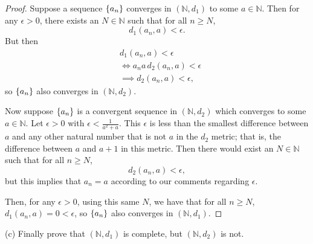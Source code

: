 \documentclass{article}
\newcommand{\N}{\mathbb{N}}
\begin{document}
\begin{proof}

Suppose a sequence $\cbr{a_n}$ converges in $(\N, d_1)$ to some $a \in
\N$. Then for any $\epsilon > 0$, there exists an $N \in \N$ such that
for all $n \geq N$,
%
\begin{equation*}
    d_1(a_n, a) < \epsilon
    .
\end{equation*}
%
But then
%
\begin{align*}
    &d_1(a_n, a) < \epsilon \\
    &\iff a_n a \, d_2(a_n, a) < \epsilon \\
    &\implies d_2(a_n, a) < \epsilon
    ,
\end{align*}
%
so $\cbr{a_n}$ also converges in $(\N, d_2)$.

Now suppose $\cbr{a_n}$ is a convergent sequence in $(\N, d_2)$ which
converges to some $a \in \N$. Let $\epsilon > 0$ with $\epsilon <
\frac{1}{a^2 + a}$. This $\epsilon$ is less than the smallest difference
between $a$ and any other natural number that is not $a$ in the $d_2$
metric; that is, the difference between $a$ and $a + 1$ in this metric.
Then there would exist an $N \in \N$ such that for all $n \geq N$,
%
\begin{equation*}
    d_2(a_n, a) < \epsilon
    ,
\end{equation*}
%
but this implies that $a_n = a$ according to our comments regarding
$\epsilon$.

Then, for any $\epsilon > 0$, using this same $N$, we have that for all
$n \geq N$, $d_1(a_n, a) = 0 < \epsilon$, so $\cbr{a_n}$ also converges
in $(\N, d_1)$.

\end{proof}

\newpage

(c) Finally prove that $(\N, d_1)$ is complete, but $(\N, d_2)$ is not.
\end{document}
